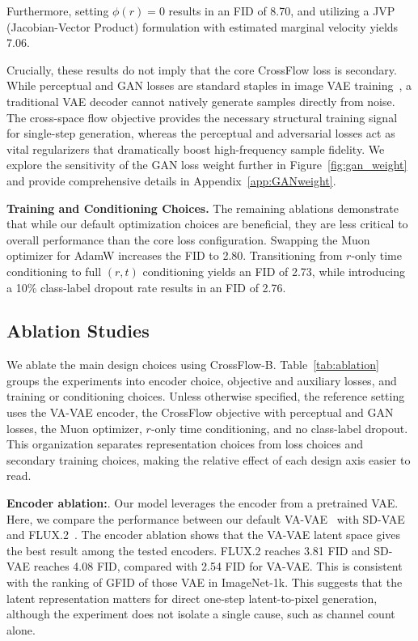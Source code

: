 Furthermore, setting $\phi(r) = 0$ results in an FID of 8.70, and utilizing a JVP (Jacobian-Vector Product) formulation with estimated marginal velocity yields 7.06.

Crucially, these results do not imply that the core CrossFlow loss is secondary. While perceptual and GAN losses are standard staples in image VAE training~\citep{vqgan}, a traditional VAE decoder cannot natively generate samples directly from noise. The cross-space flow objective provides the necessary structural training signal for single-step generation, whereas the perceptual and adversarial losses act as vital regularizers that dramatically boost high-frequency sample fidelity. We explore the sensitivity of the GAN loss weight further in Figure~\ref{fig:gan_weight} and provide comprehensive details in Appendix~\ref{app:GANweight}.

\textbf{Training and Conditioning Choices.} The remaining ablations demonstrate that while our default optimization choices are beneficial, they are less critical to overall performance than the core loss configuration. Swapping the Muon optimizer for AdamW increases the FID to 2.80. Transitioning from $r$-only time conditioning to full $(r, t)$ conditioning yields an FID of 2.73, while introducing a 10\% class-label dropout rate results in an FID of 2.76.

\subsection{Ablation Studies}
We ablate the main design choices using CrossFlow-B. Table~\ref{tab:ablation} groups the experiments into encoder choice, objective and auxiliary losses, and training or conditioning choices. Unless otherwise specified, the reference setting uses the VA-VAE encoder, the CrossFlow objective with perceptual and GAN losses, the Muon optimizer, $r$-only time conditioning, and no class-label dropout. This organization separates representation choices from loss choices and secondary training choices, making the relative effect of each design axis easier to read.

\textbf{Encoder ablation:}. Our model leverages the encoder from a pretrained VAE. Here, we compare the performance between our default VA-VAE~\citep{VAVAE} with SD-VAE~\citep{ldm} and FLUX.2~\citep{flux2}.
The encoder ablation shows that the VA-VAE latent space gives the best result among the tested encoders. FLUX.2 reaches 3.81 FID and SD-VAE reaches 4.08 FID, compared with 2.54 FID for VA-VAE. This is consistent with the ranking of GFID of those VAE in ImageNet-1k. 
This suggests that the latent representation matters for direct one-step latent-to-pixel generation, although the experiment does not isolate a single cause, such as channel count alone.

